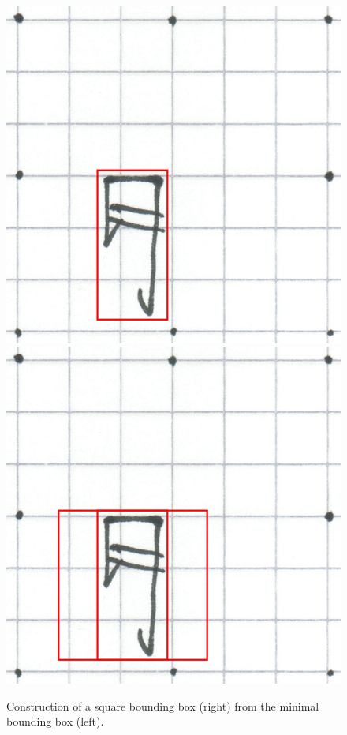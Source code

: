 \begin{figure}[htbp]
  \begin{center}
    \includegraphics[scale=0.2]{images/input2WithMinimalBoundingBox.png}
    \includegraphics[scale=0.2]{images/input3WithSquareBoundingBox.png}
    \caption{Construction of a square bounding box (right) from the minimal bounding box (left).}
    \label{fig:inputsquareboundingbox}
  \end{center}
\end{figure}
